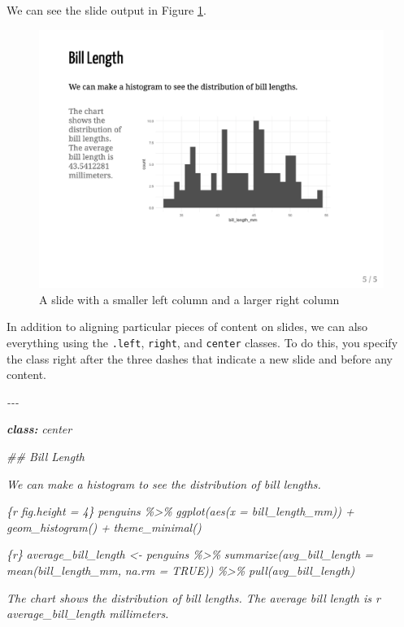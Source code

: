 \documentclass[
]{book}
\newenvironment{Shaded}{\begin{snugshade}}{\end{snugshade}}
\newcommand{\AnnotationTok}[1]{\textcolor[rgb]{0.56,0.35,0.01}{\textbf{\textit{#1}}}}
\newcommand{\CommentTok}[1]{\textcolor[rgb]{0.56,0.35,0.01}{\textit{#1}}}
\begin{document}
We can see the slide output in Figure \ref{fig:slide-two-columns-v2}.

\begin{figure}
\includegraphics[width=1\linewidth]{assets/slide-two-columns-v2} \caption{A slide with a smaller left column and a larger right column}\label{fig:slide-two-columns-v2}
\end{figure}

In addition to aligning particular pieces of content on slides, we can also everything using the \texttt{.left}, \texttt{right}, and \texttt{center} classes. To do this, you specify the class right after the three dashes that indicate a new slide and before any content.

\begin{Shaded}
\begin{Highlighting}[]
\CommentTok{{-}{-}{-}}

\AnnotationTok{class:}\CommentTok{ center}

\CommentTok{\#\# Bill Length}

\CommentTok{We can make a histogram to see the distribution of bill lengths.}

\CommentTok{\textasciigrave{}\textasciigrave{}\textasciigrave{}\{r fig.height = 4\}}
\CommentTok{penguins \%\textgreater{}\% }
\CommentTok{  ggplot(aes(x = bill\_length\_mm)) +}
\CommentTok{  geom\_histogram() +}
\CommentTok{  theme\_minimal()}
\CommentTok{\textasciigrave{}\textasciigrave{}\textasciigrave{}}

\CommentTok{\textasciigrave{}\textasciigrave{}\textasciigrave{}\{r\}}
\CommentTok{average\_bill\_length \textless{}{-} penguins \%\textgreater{}\% }
\CommentTok{  summarize(avg\_bill\_length = mean(bill\_length\_mm,}
\CommentTok{                                   na.rm = TRUE)) \%\textgreater{}\% }
\CommentTok{  pull(avg\_bill\_length)}
\CommentTok{\textasciigrave{}\textasciigrave{}\textasciigrave{}}

\CommentTok{The chart shows the distribution of bill lengths. The average bill length is \textasciigrave{}r average\_bill\_length\textasciigrave{} millimeters.}
\end{Highlighting}
\end{Shaded}
\end{document}
